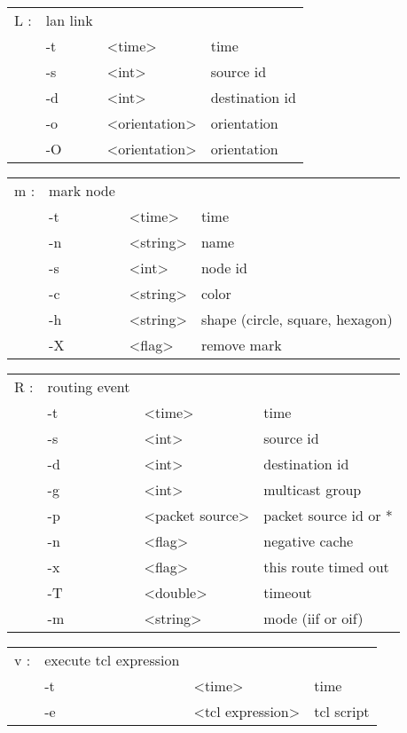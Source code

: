   \begin{tabular}{llll}
  L : & lan link & & \\
    &  -t & <time> & time \\
    &  -s & <int> & source id \\
    &  -d & <int> & destination id \\
    &  -o & <orientation> & orientation \\
    &  -O & <orientation> & orientation \\
  \end{tabular}

  \begin{tabular}{llll}
  m : & mark node & & \\
    &  -t & <time> & time \\
    &  -n & <string> & name \\
    &  -s & <int> & node id \\
    &  -c & <string> & color \\
    &  -h & <string> & shape (circle, square, hexagon) \\
    &  -X & <flag> & remove mark \\
  \end{tabular}

  \begin{tabular}{llll}
  R : & routing event & & \\
    &  -t & <time> & time \\
    &  -s & <int> & source id \\
    &  -d & <int> & destination id \\
    &  -g & <int> & multicast group \\
    &  -p & <packet source> & packet source id or * \\
    &  -n & <flag> & negative cache \\
    &  -x & <flag> & this route timed out \\
    &  -T & <double> & timeout \\
    &  -m & <string> & mode (iif or oif) \\
  \end{tabular}

  \begin{tabular}{llll}
  v : & execute tcl expression & & \\
    &  -t & <time> & time \\
    &  -e & <tcl expression> & tcl script \\
  \end{tabular}

